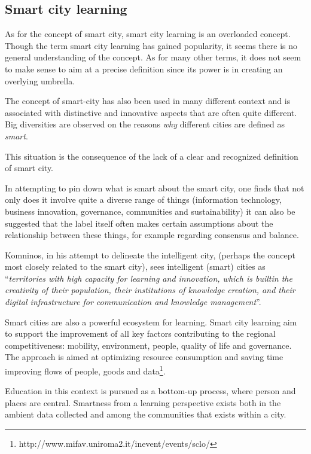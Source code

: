 \subsection{Smart city learning}
As for the concept of smart city, smart city learning is an overloaded concept. Though the term smart city learning has gained popularity, it seems there is no general understanding of the concept. As for many other terms, it does not seem to make sense to aim at a precise definition since its power is in creating an overlying umbrella.

The concept of smart-city has also been used in many different context and is associated with distinctive and innovative aspects that are often quite different. Big diversities are observed on the reasons \textit{why} different cities are defined as \textit{smart}.

This situation is the consequence of the lack of a clear and recognized definition of smart city.

In attempting to pin down what is smart about the smart city, one finds that not only does it involve quite a diverse range of things (information technology, business innovation, governance, communities and sustainability) it can also be suggested that the label itself often makes certain assumptions about the relationship between these things, for example regarding consensus and balance\cite{hollands_will_2008}.

Komninos\cite{komninos_intelligent_2002}, in his attempt to delineate the intelligent city, (perhaps the concept most closely related to the smart city), sees intelligent (smart) cities as ``\textit{territories with high capacity for learning and innovation, which is built\textendash in the creativity of their population, their institutions of knowledge creation, and their digital infrastructure for communication and knowledge management}''.

Smart cities are also a powerful ecosystem for learning. Smart city learning aim to support the improvement of all key factors contributing to the regional competitiveness: mobility, environment, people, quality of life and governance. The approach is aimed at optimizing resource consumption and saving time improving flows of people, goods and data\footnote{http://www.mifav.uniroma2.it/inevent/events/sclo/}.

Education in this context is pursued as a bottom-up process, where person and places are central. Smartness from a learning perspective exists both in the ambient data collected and among the communities that exists within a city.

